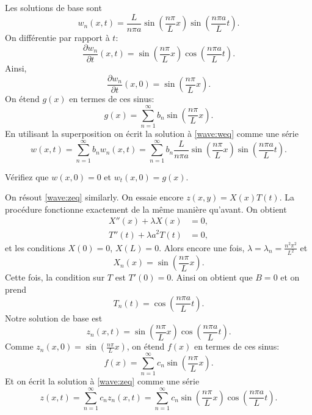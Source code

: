Les solutions de base sont
\begin{equation*}
w_n(x,t) = 
\frac{L}{n \pi a} 
\sin \left( \frac{n \pi}{L} x \right)
\sin \left( \frac{n \pi a}{L} t \right) .
\end{equation*}
On différentie par rapport à $t$:
\begin{equation*}
\frac{\partial w_n}{\partial t}(x,t) = 
\sin \left( \frac{n \pi}{L} x \right)
\cos \left( \frac{n \pi a}{L} t \right) .
\end{equation*}
Ainsi,
\begin{equation*}
\frac{\partial w_n}{\partial t}(x,0) =
\sin \left( \frac{n \pi}{L} x \right) .
\end{equation*}
On étend $g(x)$ en termes de ces sinus:
\begin{equation*}
g(x) =
\sum_{n=1}^\infty b_n \sin \left( \frac{n \pi}{L} x \right) .
\end{equation*}
En utilisant la superposition
on écrit la solution à \eqref{wave:weq} comme une série
\begin{equation*}
w(x,t) =
\sum_{n=1}^\infty
b_n
w_n(x,t)
=
\sum_{n=1}^\infty
b_n
\frac{L}{n \pi a}
\sin \left( \frac{n \pi}{L} x \right)
\sin \left( \frac{n \pi a}{L} t \right) .
\end{equation*}

\begin{exercise}
Vérifiez que $w(x,0) = 0$ et
$w_t(x,0) = g(x)$.
\end{exercise}

On résout \eqref{wave:zeq} similarly.  On essaie encore
$z(x,y) = X(x)T(t)$.  
La procédure fonctionne exactement de la même manière qu'avant.
On obtient
\begin{align*}
X''(x) + \lambda X(x) &= 0 , \\
T''(t) + \lambda a^2 T(t) &= 0 ,
\end{align*}
et les conditions $X(0) = 0$, $X(L) = 0$.  Alors encore une fois, 
$\lambda = \lambda_n = \frac{n^2 \pi^2}{L^2}$ et
\begin{equation*}
X_n(x) = \sin \left( \frac{n \pi}{L} x \right) .
\end{equation*}
Cette fois,  la condition sur $T$ est $T'(0) = 0$.  Ainsi on obtient que $B = 0$ et on prend
\begin{equation*}
T_n(t) = \cos \left( \frac{n \pi a}{L} t \right).
\end{equation*}
Notre solution de base est
\begin{equation*}
z_n(x,t) = 
\sin \left( \frac{n \pi}{L} x \right)
\cos \left( \frac{n \pi a}{L} t \right) .
\end{equation*}
Comme $z_n(x,0) = \sin \left( \frac{n \pi}{L} x \right)$,
on étend $f(x)$ en termes de ces sinus:
\begin{equation*}
f(x) =
\sum_{n=1}^\infty c_n \sin \left( \frac{n \pi}{L} x \right) .
\end{equation*}
Et on écrit la solution à \eqref{wave:zeq} comme une série
\begin{equation*}
z(x,t) =
\sum_{n=1}^\infty
c_n
z_n(x,t)
=
\sum_{n=1}^\infty
c_n
\sin \left( \frac{n \pi}{L} x \right)
\cos \left( \frac{n \pi a}{L} t \right) .
\end{equation*}

